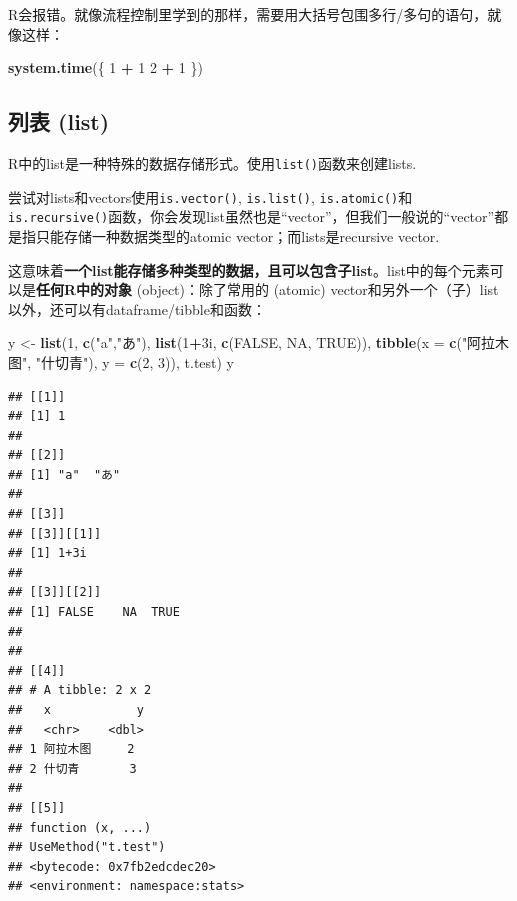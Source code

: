 \documentclass[]{book}
\newenvironment{Shaded}{\begin{snugshade}}{\end{snugshade}}
\newcommand{\DataTypeTok}[1]{\textcolor[rgb]{0.13,0.29,0.53}{#1}}
\newcommand{\DecValTok}[1]{\textcolor[rgb]{0.00,0.00,0.81}{#1}}
\newcommand{\KeywordTok}[1]{\textcolor[rgb]{0.13,0.29,0.53}{\textbf{#1}}}
\newcommand{\NormalTok}[1]{#1}
\newcommand{\OperatorTok}[1]{\textcolor[rgb]{0.81,0.36,0.00}{\textbf{#1}}}
\newcommand{\OtherTok}[1]{\textcolor[rgb]{0.56,0.35,0.01}{#1}}
\newcommand{\StringTok}[1]{\textcolor[rgb]{0.31,0.60,0.02}{#1}}
\begin{document}
R会报错。就像流程控制里学到的那样，需要用大括号包围多行/多句的语句，就像这样：

\begin{Shaded}
\begin{Highlighting}[]
\KeywordTok{system.time}\NormalTok{(\{}
  \DecValTok{1} \OperatorTok{+}\StringTok{ }\DecValTok{1}
  \DecValTok{2} \OperatorTok{+}\StringTok{ }\DecValTok{1}
\NormalTok{\})}
\end{Highlighting}
\end{Shaded}

\hypertarget{list-intro}{%
\subsection{列表 (list)}\label{list-intro}}

R中的list是一种特殊的数据存储形式。使用\texttt{list()}函数来创建lists.

尝试对lists和vectors使用\texttt{is.vector()}, \texttt{is.list()}, \texttt{is.atomic()}和\texttt{is.recursive()}函数，你会发现list虽然也是``vector''，但我们一般说的``vector''都是指只能存储一种数据类型的atomic vector；而lists是recursive vector.

这意味着\textbf{一个list能存储多种类型的数据，且可以包含子list}。list中的每个元素可以是\textbf{任何R中的对象} (object)：除了常用的 (atomic) vector和另外一个（子）list以外，还可以有dataframe/tibble和函数：

\begin{Shaded}
\begin{Highlighting}[]
\NormalTok{y <-}\StringTok{ }\KeywordTok{list}\NormalTok{(}\DecValTok{1}\NormalTok{, }\KeywordTok{c}\NormalTok{(}\StringTok{"a"}\NormalTok{,}\StringTok{"あ"}\NormalTok{), }\KeywordTok{list}\NormalTok{(}\DecValTok{1}\OperatorTok{+}\NormalTok{3i, }\KeywordTok{c}\NormalTok{(}\OtherTok{FALSE}\NormalTok{, }\OtherTok{NA}\NormalTok{, }\OtherTok{TRUE}\NormalTok{)), }
          \KeywordTok{tibble}\NormalTok{(}\DataTypeTok{x =} \KeywordTok{c}\NormalTok{(}\StringTok{"阿拉木图"}\NormalTok{, }\StringTok{"什切青"}\NormalTok{), }\DataTypeTok{y =} \KeywordTok{c}\NormalTok{(}\DecValTok{2}\NormalTok{, }\DecValTok{3}\NormalTok{)),}
\NormalTok{          t.test)}
\NormalTok{y}
\end{Highlighting}
\end{Shaded}

\begin{verbatim}
## [[1]]
## [1] 1
## 
## [[2]]
## [1] "a"  "あ"
## 
## [[3]]
## [[3]][[1]]
## [1] 1+3i
## 
## [[3]][[2]]
## [1] FALSE    NA  TRUE
## 
## 
## [[4]]
## # A tibble: 2 x 2
##   x            y
##   <chr>    <dbl>
## 1 阿拉木图     2
## 2 什切青       3
## 
## [[5]]
## function (x, ...) 
## UseMethod("t.test")
## <bytecode: 0x7fb2edcdec20>
## <environment: namespace:stats>
\end{verbatim}
\end{document}
